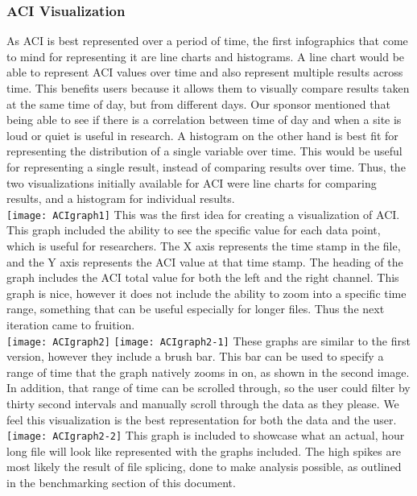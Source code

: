\subsubsection{ACI Visualization}
As ACI is best represented over a period of time, the first infographics that come to mind for representing it are line charts and histograms. A line chart would be able to represent ACI values over time and also represent multiple results across time. This benefits users because it allows them to visually compare results taken at the same time of day, but from different days. Our sponsor mentioned that being able to see if there is a correlation between time of day and when a site is loud or quiet is useful in research. A histogram on the other hand is best fit for representing the distribution of a single variable over time. This would be useful for representing a single result, instead of comparing results over time. Thus, the two visualizations initially available for ACI were line charts for comparing results, and a histogram for individual results.\\

\texttt{[image: ACIgraph1]}
This was the first idea for creating a visualization of ACI. This graph included the ability to see the specific value for each data point, which is useful for researchers. The X axis represents the time stamp in the file, and the Y axis represents the ACI value at that time stamp. The heading of the graph includes the ACI total value for both the left and the right channel. This graph is nice, however it does not include the ability to zoom into a specific time range, something that can be useful especially for longer files. Thus the next iteration came to fruition.\\

\texttt{[image: ACIgraph2]}
\texttt{[image: ACIgraph2-1]}
These graphs are similar to the first version, however they include a brush bar. This bar can be used to specify a range of time that the graph natively zooms in on, as shown in the second image. In addition, that range of time can be scrolled through, so the user could filter by thirty second intervals and manually scroll through the data as they please. We feel this visualization is the best representation for both the data and the user.\\

\texttt{[image: ACIgraph2-2]}
This graph is included to showcase what an actual, hour long file will look like represented with the graphs included. The high spikes are most likely the result of file splicing, done to make analysis possible, as outlined in the benchmarking section of this document.
